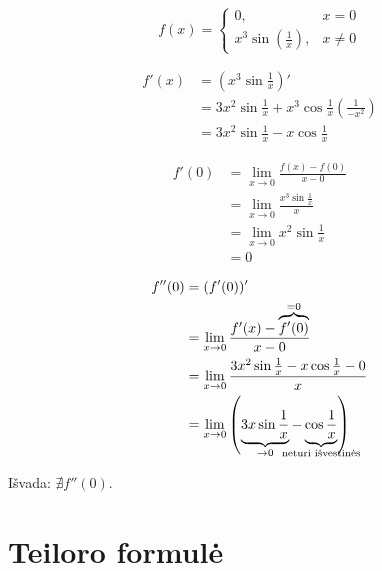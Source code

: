 \begin{exmp}
  \begin{equation*}
    f(x) = 
    \begin{cases}
      0, & x = 0 \\
      x^{3} \sin \left( \frac{1}{x} \right), & x \neq 0
    \end{cases}
  \end{equation*}

  \begin{align*}
    f'(x) 
    &= \left( x^{3} \sin \frac{1}{x} \right)' \\
    &= 3 x^{2} \sin \frac{1}{x} +   
      x^{3} \cos \frac{1}{x} \left( \frac{1}{-x^{2}} \right) \\
    &= 3 x^{2} \sin \frac{1}{x} - x \cos \frac{1}{x}
  \end{align*}

  \begin{align*}
    f'(0)
    &= \lim_{x \to 0} \frac{f(x) - f(0)}{x - 0} \\
    &= \lim_{x \to 0} \frac{x^{3} \sin \frac{1}{x}}{x} \\
    &= \lim_{x \to 0} x^{2} \sin \frac{1}{x} \\
    &= 0
  \end{align*}

  \begin{align*}
    f''(0)
    &= (f'(0))' \\
    &= \lim_{x \to 0} \frac{f'(x) - \overbrace{f'(0)}^{= 0}}{x - 0} \\
    &= \lim_{x \to 0} 
      \frac{3 x^{2} \sin \frac{1}{x} - x \cos \frac{1}{x} - 0}{x} \\
    &= \lim_{x \to 0} 
      \left( 
        \underbrace{3 x \sin \frac{1}{x}}_{\to 0} - 
        \underbrace{\cos \frac{1}{x}}_{\mathclap{\text{neturi išvestinės}}} 
      \right)
  \end{align*}

  Išvada: $\nexists f''(0)$.
\end{exmp}

\section{Teiloro formulė}

